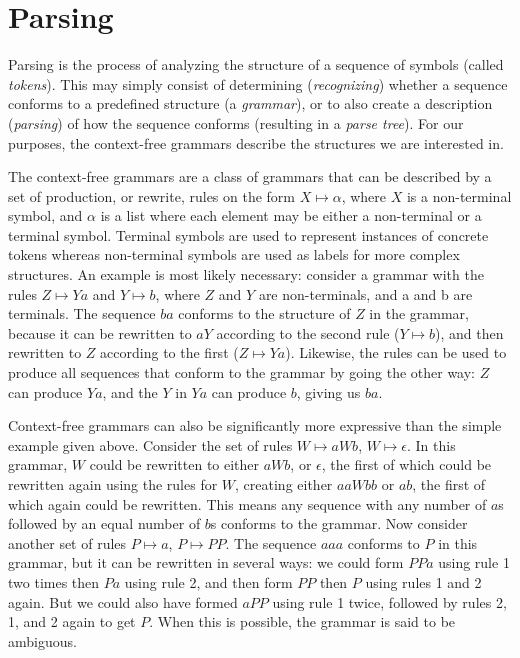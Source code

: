 
\chapter{Parsing} \label{Parsing}

	Parsing is the process of analyzing the structure of a sequence of symbols
	(called \emph{tokens}). This may simply consist of determining
	(\emph{recognizing}) whether a sequence conforms to a predefined structure
	(a \emph{grammar}), or to also create a description (\emph{parsing}) of how
	the sequence conforms (resulting in a \emph{parse tree}). For our
	purposes, the context-free grammars describe the structures we are
	interested in.

	The context-free grammars are a class of grammars that can be described by
	a set of production, or rewrite, rules on the form $X \mapsto \alpha$,
	where $X$ is a non-terminal symbol, and $\alpha$ is a list where each
	element may be either a non-terminal or a terminal symbol. Terminal symbols
	are used to represent instances of concrete tokens whereas non-terminal
	symbols are used as labels for more complex structures. An example is most
	likely necessary: consider a grammar with the rules $Z \mapsto Ya$ and $Y
	\mapsto b$, where $Z$ and $Y$ are non-terminals, and a and b are terminals.
	The sequence $ba$ conforms to the structure of $Z$ in the grammar, because
	it can be rewritten to $aY$ according to the second rule ($Y \mapsto b$),
	and then rewritten to $Z$ according to the first ($Z \mapsto Ya$).
	Likewise, the rules can be used to produce all sequences that conform to
	the grammar by going the other way: $Z$ can produce $Ya$, and the $Y$ in
	$Ya$ can produce $b$, giving us $ba$.

	Context-free grammars can also be significantly more expressive than the
	simple example given above. Consider the set of rules {$W \mapsto aWb$, $W
	\mapsto \epsilon$}. In this grammar, $W$ could be rewritten to either
	$aWb$, or $\epsilon$, the first of which could be rewritten again using the
	rules for $W$, creating either $aaWbb$ or $ab$, the first of which again
	could be rewritten. This means any sequence with any number of $a$s
	followed by an equal number of $b$s conforms to the grammar. Now consider
	another set of rules {$P \mapsto a$, $P \mapsto PP$}. The sequence $aaa$
	conforms to $P$ in this grammar, but it can be rewritten in several ways:
	we could form $PPa$ using rule 1 two times then $Pa$ using rule 2, and then
	form $PP$ then $P$ using rules 1 and 2 again. But we could also have formed
	$aPP$ using rule 1 twice, followed by rules 2, 1, and 2 again to get $P$.
	When this is possible, the grammar is said to be ambiguous.


